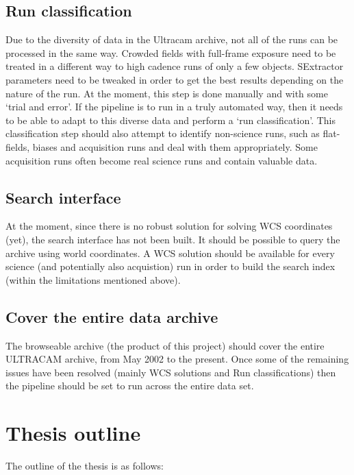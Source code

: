 \documentclass[a4paper,10pt]{article}
\begin{document}
\subsection{Run classification}
Due to the diversity of data in the Ultracam archive, not all of the runs can be processed in the same way. Crowded fields with full-frame exposure need to be treated in a different way to high cadence runs of only a few objects. SExtractor parameters need to be tweaked in order to get the best results depending on the nature of the run. At the moment, this step is done manually and with some `trial and error'. If the pipeline is to run in a truly automated way, then it needs to be able to adapt to this diverse data and perform a `run classification'. This classification step should also attempt to identify non-science runs, such as flat-fields, biases and acquisition runs and deal with them appropriately. Some acquisition runs often become real science runs and contain valuable data. 

\subsection{Search interface}
At the moment, since there is no robust solution for solving WCS coordinates (yet), the search interface has not been built. It should be possible to query the archive using world coordinates. A WCS solution should be available for every science (and potentially also acquistion) run in order to build the search index (within the limitations mentioned above). 

\subsection{Cover the entire data archive} 
The browseable archive (the product of this project) should cover the entire ULTRACAM archive, from May 2002 to the present. Once some of the remaining issues have been resolved (mainly WCS solutions and Run classifications) then the pipeline should be set to run across the entire data set. 

\section{Thesis outline}

The outline of the thesis is as follows:
\end{document}
